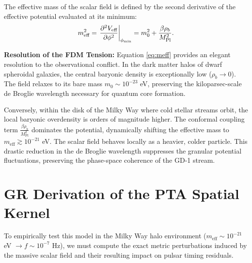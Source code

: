 \documentclass[aps,prd,twocolumn,nofootinbib,superscriptaddress,10pt]{revtex4-2}
\begin{document}
The effective mass of the scalar field is defined by the second derivative of the effective potential evaluated at its minimum:
\begin{equation}
    m_{\text{eff}}^2 = \eval{\frac{\partial^2 V_{\text{eff}}}{\partial \phi^2}}_{\phi_{\text{min}}} = m_0^2 + \frac{\beta \rho_b}{M_{\text{Pl}}^2}.
    \label{eq:meff}
\end{equation}

\textbf{Resolution of the FDM Tension:} Equation \eqref{eq:meff} provides an elegant resolution to the observational conflict. In the dark matter halos of dwarf spheroidal galaxies, the central baryonic density is exceptionally low ($\rho_b \to 0$). The field relaxes to its bare mass $m_0 \sim 10^{-23}$ eV, preserving the kiloparsec-scale de Broglie wavelength necessary for quantum core formation. 

Conversely, within the disk of the Milky Way where cold stellar streams orbit, the local baryonic overdensity is orders of magnitude higher. The conformal coupling term $\frac{\beta \rho_b}{M_{\text{Pl}}^2}$ dominates the potential, dynamically shifting the effective mass to $m_{\text{eff}} \gtrsim 10^{-21}$ eV. The scalar field behaves locally as a heavier, colder particle. This drastic reduction in the de Broglie wavelength suppresses the granular potential fluctuations, preserving the phase-space coherence of the GD-1 stream.

\section{GR Derivation of the PTA Spatial Kernel}

To empirically test this model in the Milky Way halo environment ($m_{\text{eff}} \sim 10^{-21}$ eV $\rightarrow f \sim 10^{-7}$ Hz), we must compute the exact metric perturbations induced by the massive scalar field and their resulting impact on pulsar timing residuals. 
\end{document}
